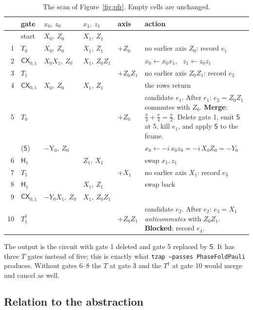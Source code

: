 \documentclass[11pt]{article}
\theoremstyle{definition}
\theoremstyle{remark}
\newcommand{\adj}{^{\dagger}}
\newcommand{\tY}{\mathrm{Y}}
\newcommand{\gate}[1]{\mathsf{#1}}
\begin{document}
\begin{table}[h]
\centering
\renewcommand{\arraystretch}{1.25}
\small
\begin{tabular}{rllllp{6.1cm}}
\toprule
 & gate & $x_0,\ z_0$ & $x_1,\ z_1$ & axis & action \\
\midrule
  & start & $X_0,\ Z_0$ & $X_1,\ Z_1$ & & \\
1 & $T_0$ & $X_0,\ Z_0$ & $X_1,\ Z_1$ & $+Z_0$ & no earlier axis $Z_0$: record $e_1$ \\
2 & $\gate{CX}_{0,1}$ & $X_0X_1,\ Z_0$ & $X_1,\ Z_0Z_1$ & & $x_0 \gets x_0x_1$, \ $z_1 \gets z_0z_1$ \\
3 & $T_1$ & & & $+Z_0Z_1$ & no earlier axis $Z_0Z_1$: record $e_2$ \\
4 & $\gate{CX}_{0,1}$ & $X_0,\ Z_0$ & $X_1,\ Z_1$ & & the rows return \\
5 & $T_0$ & & & $+Z_0$ & candidate $e_1$. After $e_1$: $e_2 = Z_0Z_1$ commutes with $Z_0$. \textbf{Merge}: $\tfrac{\pi}{4}+\tfrac{\pi}{4} = \tfrac{\pi}{2}$. Delete gate 1, emit $\gate S$ at 5, kill $e_1$, and apply $\gate S$ to the frame. \\
  & ($\gate S$) & $-\tY_0,\ Z_0$ & & & $x_0 \gets -i\,x_0z_0 = -i\,X_0Z_0 = -Y_0$ \\
6 & $\gate H_1$ & & $Z_1,\ X_1$ & & swap $x_1, z_1$ \\
7 & $T_1$ & & & $+X_1$ & no earlier axis $X_1$: record $e_3$ \\
8 & $\gate H_1$ & & $X_1,\ Z_1$ & & swap back \\
9 & $\gate{CX}_{0,1}$ & $-Y_0X_1,\ Z_0$ & $X_1,\ Z_0Z_1$ & & \\
10 & $T\adj_1$ & & & $+Z_0Z_1$ & candidate $e_2$. After $e_2$: $e_3 = X_1$ \emph{anticommutes} with $Z_0Z_1$. \textbf{Blocked}: record $e_4$. \\
\bottomrule
\end{tabular}
\caption{The scan of Figure~\ref{fig:pfr}. Empty cells are unchanged.}
\label{tab:pfr-trace}
\end{table}

The output is the circuit with gate 1 deleted and gate 5 replaced by $\gate S$. It has
three $T$ gates instead of five; this is exactly what \texttt{tzap --passes PhaseFoldPauli}
produces. Without gates 6--8 the $T$ at gate 3 and the $T\adj$ at gate 10 would merge and
cancel as well.

\subsection{Relation to the abstraction}
\end{document}

